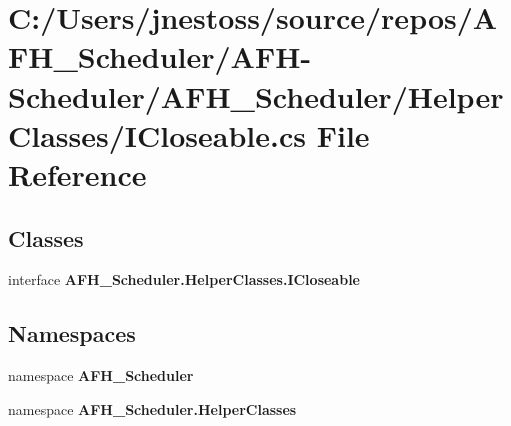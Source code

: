 \section{C\+:/\+Users/jnestoss/source/repos/\+A\+F\+H\+\_\+\+Scheduler/\+A\+F\+H-\/\+Scheduler/\+A\+F\+H\+\_\+\+Scheduler/\+Helper\+Classes/\+I\+Closeable.cs File Reference}
\label{_i_closeable_8cs}
\subsection*{Classes}
\begin{DoxyCompactItemize}
\item 
interface \textbf{ A\+F\+H\+\_\+\+Scheduler.\+Helper\+Classes.\+I\+Closeable}
\end{DoxyCompactItemize}
\subsection*{Namespaces}
\begin{DoxyCompactItemize}
\item 
namespace \textbf{ A\+F\+H\+\_\+\+Scheduler}
\item 
namespace \textbf{ A\+F\+H\+\_\+\+Scheduler.\+Helper\+Classes}
\end{DoxyCompactItemize}

